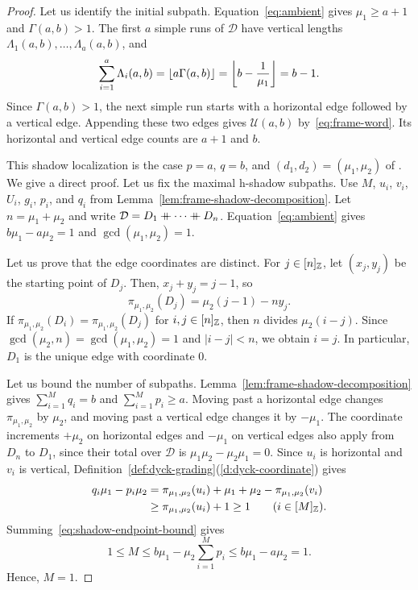 \begin{proof}
 Let us identify the initial subpath.
Equation~\eqref{eq:ambient} gives $\mu_1\ge a+1$ and $\Gamma(a,b)>1$.
The first $a$ simple runs of $\mathcal D$ have vertical lengths $\Lambda_1(a,b),\ldots,\Lambda_a(a,b)$, and
\[
 \sum_{i=1}^{a}\Lambda_i(a,b)
 =\left\lfloor a\Gamma(a,b)\right\rfloor
 =\left\lfloor b-\frac1{\mu_1}\right\rfloor=b-1.
\]
Since $\Gamma(a,b)>1$, the next simple run starts with a horizontal edge followed by a vertical edge.
Appending these two edges gives $\mathcal U(a,b)$ by~\eqref{eq:frame-word}.
Its horizontal and vertical edge counts are $a+1$ and $b$.

 This shadow localization is the case
$p=a$, $q=b$, and $(d_1,d_2)=(\mu_1,\mu_2)$ of
\cite[Lemmas~4.12 and~4.13]{B}. We give a direct proof.
Let us fix the maximal h-shadow subpaths.
Use $M$, $u_i$, $v_i$, $U_i$, $g_i$, $p_i$, and $q_i$ from Lemma~\ref{lem:frame-shadow-decomposition}.
Let $n=\mu_1+\mu_2$ and write $\mathcal D=D_1\mathbin{+\mkern-10mu+}\cdots\mathbin{+\mkern-10mu+} D_n$.
Equation~\eqref{eq:ambient} gives $b\mu_1-a\mu_2=1$ and $\gcd(\mu_1,\mu_2)=1$.

Let us prove that the edge coordinates are distinct.
For $j\in[n]_{\mathbb Z}$, let $(x_j,y_j)$ be the starting point of $D_j$.
Then, $x_j+y_j=j-1$, so
\[
 \pi_{\mu_1,\mu_2}(D_j)
 =\mu_2(j-1)-ny_j.
\]
If $\pi_{\mu_1,\mu_2}(D_i)=\pi_{\mu_1,\mu_2}(D_j)$ for $i,j\in[n]_{\mathbb Z}$,
then $n$ divides $\mu_2(i-j)$.
Since $\gcd(\mu_2,n)=\gcd(\mu_1,\mu_2)=1$ and $|i-j|<n$, we obtain $i=j$.
In particular, $D_1$ is the unique edge with coordinate $0$.

Let us bound the number of subpaths.
Lemma~\ref{lem:frame-shadow-decomposition} gives $\sum_{i=1}^{M}q_i=b$ and $\sum_{i=1}^{M}p_i\ge a$.
Moving past a horizontal edge changes $\pi_{\mu_1,\mu_2}$ by $\mu_2$, and moving past a vertical edge changes it by $-\mu_1$.
The coordinate increments $+\mu_2$ on horizontal edges and $-\mu_1$ on vertical edges also apply from $D_n$ to $D_1$, since their total over $\mathcal D$ is $\mu_1\mu_2-\mu_2\mu_1=0$.
Since $u_i$ is horizontal and $v_i$ is vertical, Definition~\ref{def:dyck-grading}(\ref{d:dyck-coordinate}) gives
\begin{equation}\label{eq:shadow-endpoint-bound}
\begin{aligned}
 q_i\mu_1-p_i\mu_2
 &=\pi_{\mu_1,\mu_2}(u_i)+\mu_1+\mu_2-\pi_{\mu_1,\mu_2}(v_i)\\
 &\ge\pi_{\mu_1,\mu_2}(u_i)+1\ge1
 \qquad(i\in[M]_{\mathbb Z}).
\end{aligned}
\end{equation}
Summing~\eqref{eq:shadow-endpoint-bound} gives
\begin{equation}\label{eq:shadow-component-count}
 1\le M\le b\mu_1-\mu_2\sum_{i=1}^{M}p_i
 \le b\mu_1-a\mu_2=1.
\end{equation}
Hence, $M=1$.


\end{proof}
